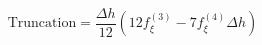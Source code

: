 \begin{equation} 
\text{Truncation} = \frac{{\Delta h}}{12} \left(12 f^{{(3)}}_{{\xi}} - 7 f^{{(4)}}_{{\xi}} {\Delta h}\right)
 \end{equation}